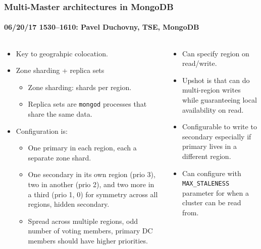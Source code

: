 \documentclass[xcolor=dvipsnames, 9pt]{beamer}
\begin{document}
\begin{frame}
    \frametitle{Multi-Master architectures in MongoDB}
    \framesubtitle{%
        06/20/17 1530--1610:
        Pavel Duchovny, TSE, MongoDB
    }
    \begin{columns}
        \begin{column}{0.5\textwidth}
            \begin{itemize}
                \item Key to geograhpic colocation.
                \item Zone sharding + replica sets
                    \begin{itemize}
                        \item Zone sharding: shards per region.
                        \item Replica sets are \texttt{mongod} processes that
                            share the same data.
                    \end{itemize}
                \item Configuration is:
                    \begin{itemize}
                        \item One primary in each region, each a separate zone
                            shard.
                        \item One secondary in its own region (prio 3), two in
                            another (prio 2), and two more in a third (prio 1,
                            0) for symmetry across all regions, hidden
                            secondary.
                        \item Spread across multiple regions, odd number of
                            voting members, primary DC members should have
                            higher priorities.
                    \end{itemize}
            \end{itemize}
        \end{column}
        \begin{column}{0.5\textwidth}
            \begin{itemize}
                \item Can specify region on read/write.
                \item Upshot is that can do multi-region writes while
                    guaranteeing local availability on read.
                \item Configurable to write to secondary especially if primary
                    lives in a different region.
                \item Can configure with \texttt{MAX\_STALENESS} parameter for
                    when a cluster can be read from.
            \end{itemize}
        \end{column}
    \end{columns}
\end{frame}
\end{document}
